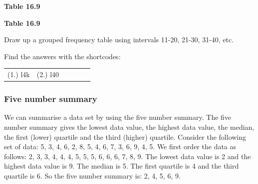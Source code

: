 \begin{description}[noitemsep]
\begin{description}[noitemsep]
\begin{enumerate}[noitemsep, label=\textbf{\arabic*}. ]
\begin{table}
\begin{center}
\begin{xtabular}[t]{|l|l|l|l|l|l|l|l|l|l|}
    \end{xtabular}
      \end{center}
    \begin{center}{\small\bfseries Table 16.9}\end{center}
    \begin{caption}{\small\bfseries Table 16.9}\end{caption}
\end{table}
    \par
   Draw up a grouped frequency table using intervals 11-20, 21-30, 31-40, etc.\newline
\end{enumerate}
  \label{m39403**end}
\par {} Find the answers with the shortcodes:
 \par \begin{tabular}[h]{cccccc}
 (1.) l4k  &  (2.) l40  & \end{tabular}
      \label{m39400*eip-435}
            \subsubsection{ Five number summary}
            \nopagebreak
            \label{m39400*eip-839}We can summarise a data set by using the five number summary. The five number summary gives the lowest data value, the highest data value, the median, the first (lower) quartile and the third (higher) quartile. Consider the following set of data: 5, 3, 4, 6, 2, 8, 5, 4, 6, 7, 3, 6, 9, 4, 5. We first order the data as follows: 2, 3, 3, 4, 4, 4, 5, 5, 5, 6, 6, 6, 7, 8, 9. The lowest data value is 2 and the highest data value is 9. The median is 5. The first quartile is 4 and the third quartile is 6. So the five number summary is: 2, 4, 5, 6, 9. 
\par \label{m39400*eip-504}

\end{description}
\end{description}
